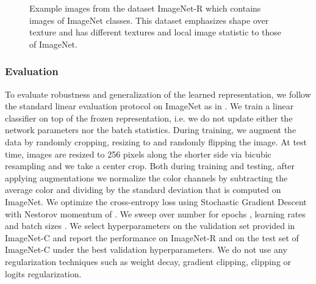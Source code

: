 \documentclass{article}
\begin{document}
\begin{figure}
\centering
{}
\caption{Example images from the dataset ImageNet-R which contains  images of  ImageNet classes. 
This dataset emphasizes shape over texture and has different textures and local image statistic to those of ImageNet.}
\label{imagenet_r}
\end{figure}




\subsubsection{Evaluation} \label{sec:robust_app.eval}
To evaluate robustness and generalization of the learned representation, we follow the standard linear evaluation protocol on ImageNet as in \citep{Chen2020ImprovedBW, chen2020simple, Kolesnikov2019RevisitingSV}.
We train a linear classifier on top of the frozen representation, i.e. we do not update either the network parameters nor the batch statistics. 
During training, we augment the data by randomly cropping, resizing to  and randomly flipping the image. 
At test time, images are resized to 256 pixels along the shorter side via bicubic resampling and we take a  center crop. 
Both during training and testing, after applying augmentations we normalize the color channels by subtracting the average color and dividing by the standard deviation that is computed on ImageNet.
We optimize the cross-entropy loss using Stochastic Gradient Descent with Nestorov momentum of .
We sweep over number for epochs , learning rates  and batch sizes . 
We select hyperparameters on the validation set provided in ImageNet-C and report the performance on ImageNet-R and on the test set of ImageNet-C under the best validation hyperparameters.
We do not use any regularization techniques such as weight decay, gradient clipping,  clipping or logits regularization.
\end{document}
